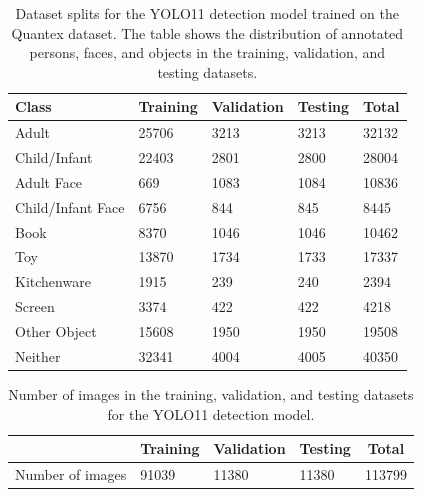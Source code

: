 \documentclass[
  man,floatsintext]{apa6}
\begin{document}
\begin{table}[tbp]

\begin{center}
\begin{threeparttable}

\caption{\label{tab:det-class-distribution}Dataset splits for the YOLO11 detection model trained on the Quantex dataset. The table shows the distribution of annotated persons, faces, and objects in the training, validation, and testing datasets.}

\begin{tabular}{lllll}
\toprule
Class & \multicolumn{1}{c}{Training} & \multicolumn{1}{c}{Validation} & \multicolumn{1}{c}{Testing} & \multicolumn{1}{c}{Total}\\
\midrule
Adult & 25706 & 3213 & 3213 & 32132\\
Child/Infant & 22403 & 2801 & 2800 & 28004\\
Adult Face & 669 & 1083 & 1084 & 10836\\
Child/Infant Face & 6756 & 844 & 845 & 8445\\
Book & 8370 & 1046 & 1046 & 10462\\
Toy & 13870 & 1734 & 1733 & 17337\\
Kitchenware & 1915 & 239 & 240 & 2394\\
Screen & 3374 & 422 & 422 & 4218\\
Other Object & 15608 & 1950 & 1950 & 19508\\
Neither & 32341 & 4004 & 4005 & 40350\\
\bottomrule
\end{tabular}

\end{threeparttable}
\end{center}

\end{table}

\begin{table}[tbp]

\begin{center}
\begin{threeparttable}

\caption{\label{tab:det-dataset-splits}Number of images in the training, validation, and testing datasets for the YOLO11 detection model.}

\begin{tabular}{lllll}
\toprule
 & \multicolumn{1}{c}{Training} & \multicolumn{1}{c}{Validation} & \multicolumn{1}{c}{Testing} & \multicolumn{1}{c}{Total}\\
\midrule
Number of images & 91039 & 11380 & 11380 & 113799\\
\bottomrule
\end{tabular}

\end{threeparttable}
\end{center}

\end{table}
\end{document}
